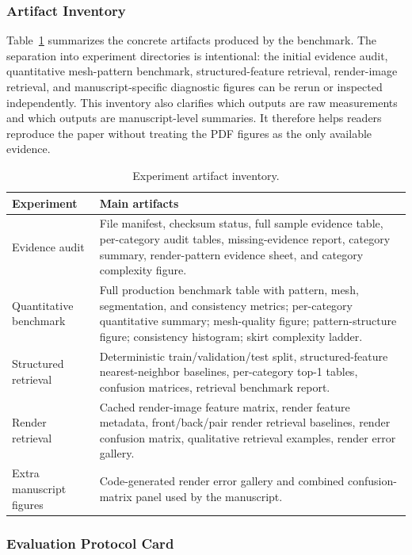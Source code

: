 \documentclass[pdflatex,sn-mathphys-num]{sn-jnl}
\begin{document}
\subsubsection{Artifact Inventory}\label{sec:artifacts}

Table~\ref{tab:artifacts} summarizes the concrete artifacts produced by the benchmark. The separation into experiment directories is intentional: the initial evidence audit, quantitative mesh-pattern benchmark, structured-feature retrieval, render-image retrieval, and manuscript-specific diagnostic figures can be rerun or inspected independently. This inventory also clarifies which outputs are raw measurements and which outputs are manuscript-level summaries. It therefore helps readers reproduce the paper without treating the PDF figures as the only available evidence.

\begin{table}[!htbp]
\caption{Experiment artifact inventory.}\label{tab:artifacts}
\centering
\begin{tabular}{p{}p{}}
\toprule
Experiment & Main artifacts \\
\midrule
Evidence audit & File manifest, checksum status, full sample evidence table, per-category audit tables, missing-evidence report, category summary, render-pattern evidence sheet, and category complexity figure. \\
Quantitative benchmark & Full production benchmark table with pattern, mesh, segmentation, and consistency metrics; per-category quantitative summary; mesh-quality figure; pattern-structure figure; consistency histogram; skirt complexity ladder. \\
Structured retrieval & Deterministic train/validation/test split, structured-feature nearest-neighbor baselines, per-category top-1 tables, confusion matrices, retrieval benchmark report. \\
Render retrieval & Cached render-image feature matrix, render feature metadata, front/back/pair render retrieval baselines, render confusion matrix, qualitative retrieval examples, render error gallery. \\
Extra manuscript figures & Code-generated render error gallery and combined confusion-matrix panel used by the manuscript. \\
\bottomrule
\end{tabular}
\end{table}

\subsubsection{Evaluation Protocol Card}\label{sec:protocol}
\end{document}
